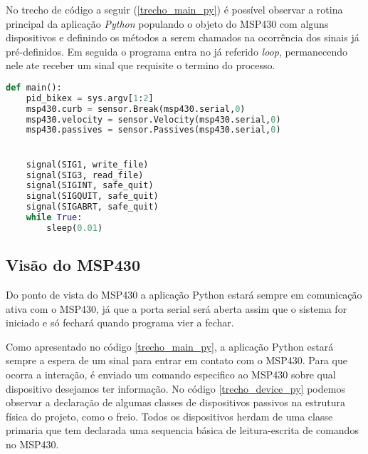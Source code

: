 No trecho de código a seguir (\ref{trecho_main_py}) é possível observar a rotina principal da aplicação \textit{Python} populando o objeto do MSP430 com alguns dispositivos e definindo os métodos a serem chamados na ocorrência dos sinais já pré-definidos. Em seguida o programa entra no já referido \textit{loop}, permanecendo nele ate receber um sinal que requisite o termino do processo.

\begin{lstlisting}[language=Python,caption={Trecho da rotina principal do script Python},label=trecho_main_py]
def main():
    pid_bikex = sys.argv[1:2]
    msp430.curb = sensor.Break(msp430.serial,0)
    msp430.velocity = sensor.Velocity(msp430.serial,0)
    msp430.passives = sensor.Passives(msp430.serial,0)


    signal(SIG1, write_file)
    signal(SIG3, read_file)
    signal(SIGINT, safe_quit)
    signal(SIGQUIT, safe_quit)
    signal(SIGABRT, safe_quit)
    while True:
        sleep(0.01)

\end{lstlisting}


\subsection{Visão do MSP430} %
\label{sub:vis_o_do_msp430}

Do ponto de vista do MSP430 a aplicação Python estará sempre em comunicação ativa com o MSP430, já que a porta serial será aberta assim que o sistema for iniciado e só fechará quando programa vier a fechar.

Como apresentado no código \ref{trecho_main_py}, a aplicação Python estará sempre a espera de um sinal para entrar em contato com o MSP430. Para que ocorra a interação, é enviado um comando especifico ao MSP430 sobre qual dispositivo desejamos ter informação. No código \ref{trecho_device_py} podemos observar a declaração de algumas classes de dispositivos passivos na estrutura física do projeto, como o freio. Todos os dispositivos herdam de uma classe primaria que tem declarada uma sequencia básica de leitura-escrita de comandos no MSP430.


